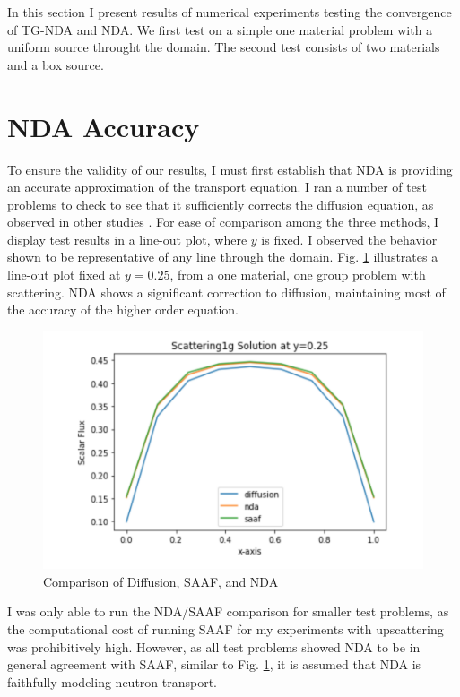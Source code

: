In this section I present results of numerical experiments testing the convergence of TG-NDA and NDA. We first test on a simple one material problem with a uniform source throught the domain. The second test consists of two materials and a box source. 

\section{NDA Accuracy}

To ensure the validity of our results, I must first establish that NDA is providing an accurate approximation of the transport equation. I ran a number of test problems to check to see that it sufficiently corrects the diffusion equation, as observed in other studies \cite{morel-holo, Wang2013}. For ease of comparison among the three methods, I display test results in a line-out plot, where $y$ is fixed. I observed the behavior shown to be representative of any line through the domain. Fig. \ref{fig:comparison} illustrates a line-out plot fixed at $y=0.25$, from a one material, one group problem with scattering. NDA shows a significant correction to diffusion, maintaining most of the accuracy of the higher order equation. 
\begin{figure}[H]
    \centering
    \includegraphics[width=.75\textwidth]{fig/LineOut25.png}
    \caption{Comparison of Diffusion, SAAF, and NDA}
    \label{fig:comparison}
\end{figure}

I was only able to run the NDA/SAAF comparison for smaller test problems, as the computational cost of running SAAF for my experiments with upscattering was prohibitively high.  However, as all test problems showed NDA to be in general agreement with SAAF, similar to Fig. \ref{fig:comparison}, it is assumed that NDA is faithfully modeling neutron transport. 

